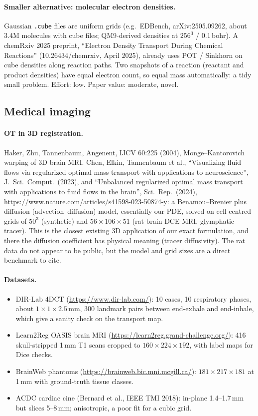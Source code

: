 \documentclass[11pt]{article}
\newcommand{\code}[1]{\texttt{#1}}
\begin{document}
\paragraph{Smaller alternative: molecular electron densities.} Gaussian \code{.cube}
files are uniform grids (e.g.\ EDBench, arXiv:2505.09262, about 3.4M molecules with
cube files; QM9-derived densities at $256^3$ / 0.1\,bohr). A chemRxiv 2025 preprint,
``Electron Density Transport During Chemical Reactions'' (10.26434/chemrxiv, April
2025), already uses POT / Sinkhorn on cube densities along reaction paths. Two
snapshots of a reaction (reactant and product densities) have equal electron count,
so equal mass automatically: a tidy small problem. Effort: low. Paper value:
moderate, novel.

\subsection{Medical imaging}

\paragraph{OT in 3D registration.} Haker, Zhu, Tannenbaum, Angenent, IJCV 60:225
(2004), Monge--Kantorovich warping of 3D brain MRI. Chen, Elkin, Tannenbaum et al.,
``Visualizing fluid flows via regularized optimal mass transport with applications to
neuroscience'', J.\ Sci.\ Comput.\ (2023), and ``Unbalanced regularized optimal mass
transport with applications to fluid flows in the brain'', Sci.\ Rep.\ (2024),
\url{https://www.nature.com/articles/s41598-023-50874-y}: a Benamou--Brenier plus
diffusion (advection--diffusion) model, essentially our PDE, solved on cell-centred
grids of $50^3$ (synthetic) and $56\times106\times51$ (rat-brain DCE-MRI, glymphatic
tracer). This is the closest existing 3D application of our exact formulation, and
there the diffusion coefficient has physical meaning (tracer diffusivity). The rat
data do not appear to be public, but the model and grid sizes are a direct benchmark
to cite.

\paragraph{Datasets.}
\begin{itemize}
  \item DIR-Lab 4DCT (\url{https://www.dir-lab.com/}): 10 cases, 10 respiratory
        phases, about $1\times1\times2.5$\,mm, 300 landmark pairs between end-exhale
        and end-inhale, which give a sanity check on the transport map.
  \item Learn2Reg OASIS brain MRI (\url{https://learn2reg.grand-challenge.org/}): 416
        skull-stripped 1\,mm T1 scans cropped to $160\times224\times192$, with label
        maps for Dice checks.
  \item BrainWeb phantoms (\url{https://brainweb.bic.mni.mcgill.ca/}):
        $181\times217\times181$ at 1\,mm with ground-truth tissue classes.
  \item ACDC cardiac cine (Bernard et al., IEEE TMI 2018): in-plane 1.4--1.7\,mm but
        slices 5--8\,mm; anisotropic, a poor fit for a cubic grid.
\end{itemize}
\end{document}
